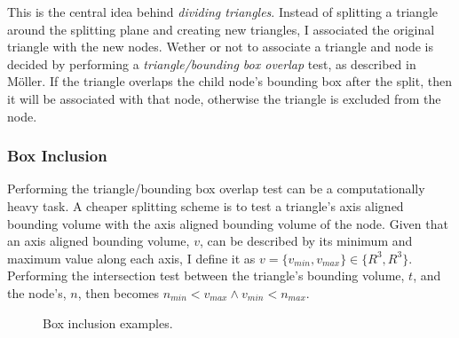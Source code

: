 This is the central idea behind \textit{dividing triangles}. Instead
of splitting a triangle around the splitting plane and creating new
triangles, I associated the original triangle with the new
nodes. Wether or not to associate a triangle and node is decided by
performing a \textit{triangle/bounding box overlap} test, as described
in Möller. If the triangle overlaps the child
node's bounding box after the split, then it will be associated with
that node, otherwise the triangle is excluded from the node.


\subsubsection{Box Inclusion}


Performing the triangle/bounding box overlap test can be a
computationally heavy task. A cheaper splitting scheme is to test a
triangle's axis aligned bounding volume with the axis aligned bounding
volume of the node. Given that an axis aligned bounding volume, $v$,
can be described by its minimum and maximum value along each axis, I
define it as $v = \{v_{min}, v_{max}\} \in \{R^3, R^3\} $. Performing
the intersection test between the triangle's bounding volume, $t$, and
the node's, $n$, then becomes $n_{min} < v_{max} \wedge v_{min} <
n_{max}$.

\begin{figure}
  \centering
  \caption{Box inclusion examples.}
  \label{fig:boxInclusion}
\end{figure}


